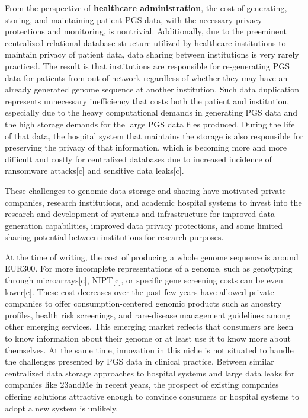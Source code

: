 \documentclass{article}
\begin{document}
From the perspective of \textbf{healthcare administration}, the cost of generating, storing, and maintaining patient PGS data, with the necessary privacy protections and monitoring, is nontrivial. Additionally, due to the preeminent centralized relational database structure utilized by healthcare institutions to maintain privacy of patient data, data sharing between institutions is very rarely practiced. The result is that institutions are responsible for re-generating PGS data for patients from out-of-network regardless of whether they may have an already generated genome sequence at another institution. Such data duplication represents unnecessary inefficiency that costs both the patient and institution, especially due to the heavy computational demands in generating PGS data and the high storage demands for the large PGS data files produced. During the life of that data, the hospital system that maintains the storage is also responsible for preserving the privacy of that information, which is becoming more and more difficult and costly for centralized databases due to increased incidence of ransomware attacks[c] and sensitive data leaks[c]. 

These challenges to genomic data storage and sharing have motivated private companies, research institutions, and academic hospital systems to invest into the research and development of systems and infrastructure for improved data generation capabilities, improved data privacy protections, and some limited sharing potential between institutions for research purposes. 

At the time of writing, the cost of producing a whole genome sequence is around EUR300. For more incomplete representations of a genome, such as genotyping through microarrays[c], NIPT[c], or specific gene screening costs can be even lower[c]. These cost decreases over the past few years have allowed private companies to offer consumption-centered genomic products such as ancestry profiles, health risk screenings, and rare-disease management guidelines among other emerging services. This emerging market reflects that consumers are keen to know information about their genome or at least use it to know more about themselves. At the same time, innovation in this niche is not situated to handle the challenges presented by PGS data in clinical practice. Between similar centralized data storage approaches to hospital systems and large data leaks for companies like 23andMe in recent years, the prospect of existing companies offering solutions attractive enough to convince consumers or hospital systems to adopt a new system is unlikely. 
\end{document}
